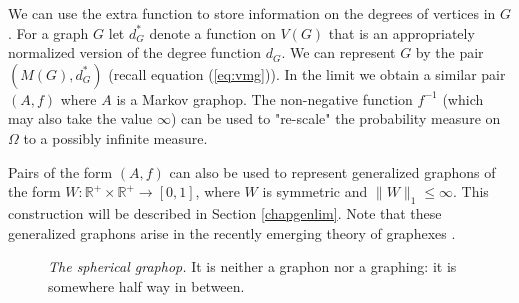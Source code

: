 \documentclass[a4wider]{amsart}
\theoremstyle{definitionbreak}\newtheorem{D}[theorem]{Definition}
\theoremstyle{definitionbreak}\newtheorem*{D*}{Definition}
\begin{document}
We can use the extra function to store information on the degrees of vertices in $G$. For a graph $G$ let $d^*_G$ denote a function on $V(G)$ that is an appropriately normalized version of the degree function $d_G$. We can represent $G$ by the pair $(M(G),d^*_G)$ (recall equation (\ref{eq:vmg})). In the limit we obtain a similar pair $(A,f)$ where $A$ is a Markov graphop. The non-negative function $f^{-1}$ (which may also take the value $\infty$) can be used to "re-scale" the probability measure on $\Omega$ to a possibly infinite measure. 

Pairs of the form $(A,f)$ can also be used to represent generalized graphons of the form $W:\mathbb{R}^+\times\mathbb{R}^+\to [0,1]$, where $W$ is symmetric and $\|W\|_1\leq\infty$. This construction will be described in Section \ref{chapgenlim}. Note that these generalized graphons arise in the recently emerging theory of graphexes \cite{BCCH, janson}. 

\begin{figure}

\caption{{\it The spherical graphop.} It is neither a graphon nor a graphing: it is somewhere half way in between.}\label{sphericgraph}

\end{figure}
\end{document}
